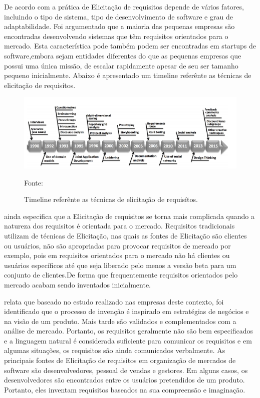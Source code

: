 De acordo com \cite{rafiq2017requirements} a prática de Elicitação de requisitos depende de vários fatores,
incluindo o tipo de sistema, tipo de desenvolvimento de software e grau de adaptabilidade. Foi argumentado que a maioria das pequenas empresas são encontradas desenvolvendo sistemas que
têm requisitos orientados para o mercado. Esta característica pode também podem ser encontradas em startups de software,embora
sejam entidades diferentes do que as pequenas empresas que possui uma única missão, de escalar rapidamente apesar de seu ser tamanho pequeno inicialmente. Abaixo é apresentado um timeline referênte as técnicas de elicitação de requisítos.

\begin{figure}[!htb]
\centering
\label{fig01}
\includegraphics[keepaspectratio=true,scale=0.6]{figuras/timeline_elicitacao.png}
\caption{Timeline referênte as técnicas de elicitação de requisítos.}
{Fonte: \cite{rafiq2017requirements}}
\end{figure}

\cite{rafiq2017requirements} ainda especifica que a Elicitação de requisitos se torna mais complicada quando a natureza dos requisitos é orientada para o mercado. Requisitos tradicionais
utilizam de técnicas de Elicitação, nas quais as fontes de Elicitação são clientes ou usuários, não são apropriadas para provocar requisitos de mercado por exemplo, pois em requisitos orientados para o mercado não há clientes ou usuários específicos até que seja liberado pelo menos a versão beta para um conjunto de clientes.De forma que frequentemente requisitos orientados pelo mercado acabam sendo inventados inicialmente.

\cite{rafiq2017requirements} relata que baseado no estudo realizado nas empresas deste contexto, foi identificado que o processo de invenção é inspirado em estratégias de negócios e na visão de um produto. Mais tarde são validados e complementados com a análise de mercado. Portanto, os requisitos geralmente não são bem especificados e a linguagem natural é considerada suficiente para comunicar os requisitos e em algumas situações, os requisitos são ainda comunicados verbalmente.
As principais fontes de Elicitação de requisitos em organização de mercados de software são desenvolvedores, pessoal de vendas
e gestores. Em alguns casos, os desenvolvedores são encontrados entre os usuários pretendidos de um produto. Portanto, eles inventam requisitos baseados na sua compreensão e imaginação.

